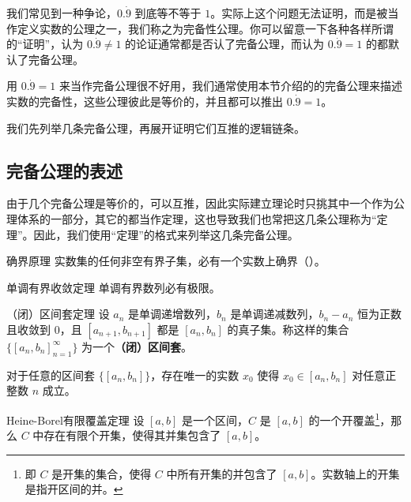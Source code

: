 


我们常见到一种争论，$0.\dot{9}$ 到底等不等于 $1$。实际上这个问题无法证明，而是被当作定义实数的公理之一，我们称之为完备性公理。你可以留意一下各种各样所谓的“证明”，认为 $0.\dot{9}\neq 1$ 的论证通常都是否认了完备公理，而认为 $0.\dot{9}=1$ 的都默认了完备公理。

用 $0.\dot{9}=1$ 来当作完备公理很不好用，我们通常使用本节介绍的的完备公理来描述实数的完备性，这些公理彼此是等价的，并且都可以推出 $0.\dot{9}=1$。

我们先列举几条完备公理，再展开证明它们互推的逻辑链条。

\subsection{完备公理的表述}

由于几个完备公理是等价的，可以互推，因此实际建立理论时只挑其中一个作为公理体系的一部分，其它的都当作定理，这也导致我们也常把这几条公理称为“定理”。因此，我们使用“定理”的格式来列举这几条完备公理。

\begin{theorem}{确界原理}\label{the_RCompl_1}
实数集的任何非空有界子集，必有一个实数上确界（）。
\end{theorem}

\begin{theorem}{单调有界收敛定理}\label{the_RCompl_2}
单调有界数列必有极限。
\end{theorem}

\begin{theorem}{（闭）区间套定理}\label{the_RCompl_3}
设 $a_n$ 是单调递增数列，$b_n$ 是单调递减数列，$b_n-a_n$ 恒为正数且收敛到 $0$，且 $[a_{n+1}, b_{n+1}]$ 都是 $[a_n, b_n]$ 的真子集。称这样的集合 $\{[a_n, b_n]_{n=1}^\infty\}$ 为一个\textbf{（闭）区间套}。

对于任意的区间套 $\{[a_n, b_n]\}$，存在唯一的实数 $x_0$ 使得 $x_0\in [a_n, b_n]$ 对任意正整数 $n$ 成立。
\end{theorem}

\begin{theorem}{Heine-Borel有限覆盖定理}\label{the_RCompl_4}
设 $[a, b]$ 是一个区间，$C$ 是 $[a, b]$ 的一个开覆盖\footnote{即 $C$ 是开集的集合，使得 $C$ 中所有开集的并包含了 $[a, b]$。实数轴上的开集是指开区间的并。}，那么 $C$ 中存在有限个开集，使得其并集包含了 $[a, b]$。
\end{theorem}

